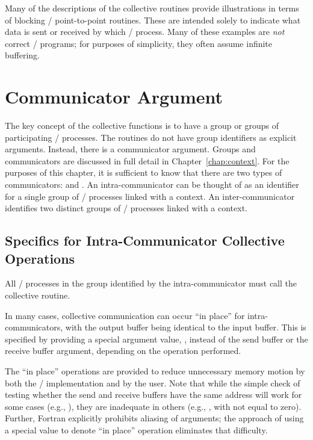Many of the descriptions of the collective routines provide illustrations in
terms of blocking \MPI/ point-to-point routines.  These are intended solely to
indicate what data is sent or received by which \MPI/ process.  Many of these
examples
are \emph{not} correct \MPI/ programs; for purposes of simplicity, they often
assume infinite buffering.


\section{Communicator Argument}
\label{sec:coll-communicator}

The key concept of the collective functions is to have a
group or groups
of participating \MPI/ processes.
The routines do not have group identifiers as explicit arguments.
Instead, there is a communicator argument.
Groups and communicators are discussed in full detail in Chapter~\ref{chap:context}.
For the purposes of this chapter, it is sufficient to know that there
are two types of communicators:
 and
.
An intra-communicator can be thought of as an identifier for a single group of \MPI/ processes
linked with a context.  An inter-communicator identifies two distinct groups of \MPI/ processes
linked with a context.


\subsection{Specifics for Intra-Communicator Collective Operations}
All \MPI/ processes in the group identified by the intra-communicator must call
the collective routine.

In many cases,
collective communication can occur ``in place''
for intra-communicators,
with the output
buffer being identical to the input buffer.  This is specified by
providing a special argument value, , instead of the
send buffer or the receive buffer argument,
depending on the operation performed.

\begin{rationale}
The ``in place'' operations are provided to reduce unnecessary memory motion by
both the \MPI/ implementation and by the user.  Note that while the simple check
of testing whether the send and receive buffers have the same address will
work for some cases (e.g., ), they are inadequate in
others (e.g., , with  not equal to zero).  Further,
Fortran explicitly prohibits aliasing of arguments; the approach of using a
special value to denote ``in place'' operation eliminates that difficulty.
\end{rationale}

